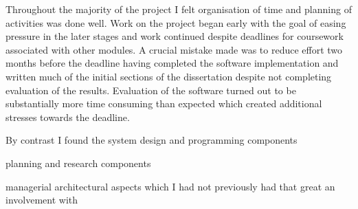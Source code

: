 \noindent
Throughout the majority of the project I felt organisation of time and planning of activities was done well. Work on the project began early with the goal of easing pressure in the later stages and work continued despite deadlines for coursework associated with other modules. A crucial mistake made was to reduce effort two months before the deadline having completed the software implementation and written much of the initial sections of the dissertation despite not completing evaluation of the results. Evaluation of the software turned out to be substantially more time consuming than expected which created additional stresses towards the deadline. \\

\noindent



By contrast I found the system design and programming components 


planning and research components 

managerial architectural aspects which I had not previously had that great an involvement with





